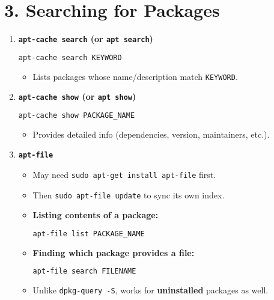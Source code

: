 \documentclass[a4paper]{report}
\begin{document}
\section*{3. Searching for Packages}

\begin{enumerate}
    \item \textbf{\texttt{apt-cache search} (or \texttt{apt search})}
    \begin{lstlisting}[language=bash]
apt-cache search KEYWORD
    \end{lstlisting}
    \begin{itemize}
        \item Lists packages whose name/description match \texttt{KEYWORD}.
    \end{itemize}

    \item \textbf{\texttt{apt-cache show} (or \texttt{apt show})}
    \begin{lstlisting}[language=bash]
apt-cache show PACKAGE_NAME
    \end{lstlisting}
    \begin{itemize}
        \item Provides detailed info (dependencies, version, maintainers, etc.).
    \end{itemize}

    \item \textbf{\texttt{apt-file}}
    \begin{itemize}
        \item May need \texttt{sudo apt-get install apt-file} first.
        \item Then \texttt{sudo apt-file update} to sync its own index.
    \end{itemize}
    \begin{itemize}
        \item \textbf{Listing contents of a package:}
        \begin{lstlisting}[language=bash]
apt-file list PACKAGE_NAME
        \end{lstlisting}
        \item \textbf{Finding which package provides a file:}
        \begin{lstlisting}[language=bash]
apt-file search FILENAME
        \end{lstlisting}
        \item Unlike \texttt{dpkg-query -S}, works for \textbf{uninstalled} packages as well.
    \end{itemize}
\end{enumerate}
\end{document}
